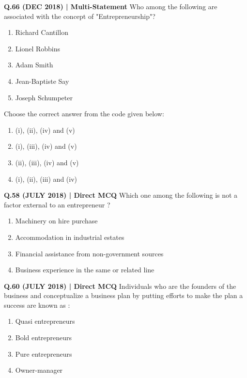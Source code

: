 \documentclass{article}
\begin{document}
\textbf{Q.66 (DEC 2018) | Multi-Statement}
Who among the following are associated with the concept of "Entrepreneurship"?
\begin{enumerate}[label=\arabic*.]
    \item Richard Cantillon
    \item Lionel Robbins
    \item Adam Smith
    \item Jean-Baptiste Say
    \item Joseph Schumpeter
\end{enumerate}
Choose the correct answer from the code given below:
\begin{enumerate}[label=(\arabic*)]
    \item (i), (ii), (iv) and (v)
    \item (i), (iii), (iv) and (v)
    \item (ii), (iii), (iv) and (v)
    \item (i), (ii), (iii) and (iv)
\end{enumerate}

\textbf{Q.58 (JULY 2018) | Direct MCQ}
Which one among the following is not a factor external to an entrepreneur ?
\begin{enumerate}[label=(\arabic*)]
    \item Machinery on hire purchase
    \item Accommodation in industrial estates
    \item Financial assistance from non-government sources
    \item Business experience in the same or related line
\end{enumerate}

\textbf{Q.60 (JULY 2018) | Direct MCQ}
Individuals who are the founders of the business and conceptualize a business plan by putting efforts to make the plan a success are known as :
\begin{enumerate}[label=(\arabic*)]
    \item Quasi entrepreneurs
    \item Bold entrepreneurs
    \item Pure entrepreneurs
    \item Owner-manager
\end{enumerate}
\end{document}
